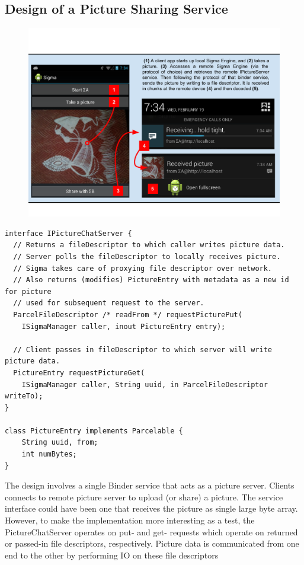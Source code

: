 \documentclass[prodmode]{acmlarge}
\begin{document}
\subsection{Design of a Picture Sharing Service}
\begin{figure}
\centering
\includegraphics[width=\textwidth]{drawings/PictureChatExample.pdf}
\end{figure}

\begin{Verbatim}[samepage=true]
interface IPictureChatServer {
  // Returns a fileDescriptor to which caller writes picture data.
  // Server polls the fileDescriptor to locally receives picture.
  // Sigma takes care of proxying file descriptor over network.
  // Also returns (modifies) PictureEntry with metadata as a new id for picture
  // used for subsequent request to the server.
  ParcelFileDescriptor /* readFrom */ requestPicturePut(
    ISigmaManager caller, inout PictureEntry entry);

  // Client passes in fileDescriptor to which server will write picture data.
  PictureEntry requestPictureGet(
    ISigmaManager caller, String uuid, in ParcelFileDescriptor writeTo);
}

class PictureEntry implements Parcelable {
    String uuid, from;
    int numBytes;
}
\end{Verbatim}


The design involves a single Binder service that acts as a picture server. Clients connects to remote picture server to upload (or share) a picture. The service interface could have been one that receives the picture as single large byte array. However, to make the implementation more interesting as a test, the PictureChatServer operates on put- and get- requests which operate on returned or passed-in file descriptors, respectively. Picture data is communicated from one end to the other by performing IO on these file descriptors
\end{document}
